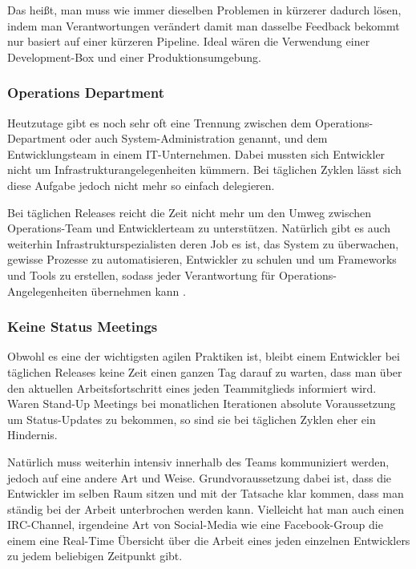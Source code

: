 Das heißt, man muss wie immer dieselben Problemen in kürzerer dadurch lösen, indem man Verantwortungen verändert damit man dasselbe Feedback bekommt nur basiert auf einer kürzeren Pipeline. Ideal wären die Verwendung einer Development-Box und einer Produktionsumgebung.

\subsubsection{Operations Department}
Heutzutage gibt es noch sehr oft eine Trennung zwischen dem Operations-Department oder auch System-Administration genannt, und dem Entwicklungsteam in einem IT-Unternehmen. Dabei mussten sich Entwickler nicht um Infrastrukturangelegenheiten kümmern. Bei täglichen Zyklen lässt sich diese Aufgabe jedoch nicht mehr so einfach delegieren. 

Bei täglichen Releases reicht die Zeit nicht mehr um den Umweg zwischen Operations-Team und Entwicklerteam zu unterstützen. Natürlich gibt es auch weiterhin Infrastrukturspezialisten deren Job es ist, das System zu überwachen, gewisse Prozesse zu automatisieren, Entwickler zu schulen und um Frameworks und Tools zu erstellen, sodass jeder Verantwortung für Operations-Angelegenheiten übernehmen kann \cite{weboperations2010}.

\subsubsection{Keine Status Meetings}
Obwohl es eine der wichtigsten agilen Praktiken ist, bleibt einem Entwickler bei täglichen Releases keine Zeit einen ganzen Tag darauf zu warten, dass man über den aktuellen Arbeitsfortschritt eines jeden Teammitglieds informiert wird. Waren Stand-Up Meetings bei monatlichen Iterationen absolute Voraussetzung um Status-Updates zu bekommen, so sind sie bei täglichen Zyklen eher ein Hindernis. 

Natürlich muss weiterhin intensiv innerhalb des Teams kommuniziert werden, jedoch auf eine andere Art und Weise. Grundvoraussetzung dabei ist, dass die Entwickler im selben Raum sitzen und mit der Tatsache klar kommen, dass man ständig bei der Arbeit unterbrochen werden kann. Vielleicht hat man auch einen IRC-Channel, irgendeine Art von Social-Media wie eine Facebook-Group die einem eine Real-Time Übersicht über die Arbeit eines jeden einzelnen Entwicklers zu jedem beliebigen Zeitpunkt gibt. 
